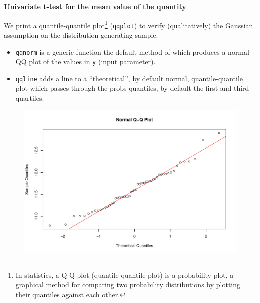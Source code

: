\documentclass[a4paper]{article}
\newcommand{\dquotes}[1]{``#1''}
\begin{document}
    \begin{flushleft}
        \large
        \textbf{Univariate t-test for the mean value of the quantity}
    \end{flushleft}
    We print a quantile-quantile plot\footnote{In statistics, a Q-Q plot (quantile-quantile plot) is a probability plot, a graphical method for comparing two probability distributions by plotting their quantiles against each other.\cite{10.1093/biomet/55.1.1}} (\texttt{qqplot}) to verify (qualitatively) the Gaussian assumption on the distribution generating sample.
    \begin{itemize}
        \item \texttt{qqnorm} is a generic function the default method of which produces a normal QQ plot of the values in \texttt{y} (input parameter).
        
        \item \texttt{qqline} adds a line to a \dquotes{theoretical}, by default normal, quantile-quantile plot which passes through the probs quantiles, by default the first and third quartiles.
    \end{itemize}
    
    \begin{figure}[!htp]
        \centering
        \includegraphics[width=\textwidth]{img/example-analysis-of-quantitative-data-2.pdf}
    \end{figure}
    
\end{document}
